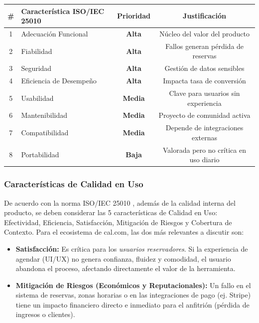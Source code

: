 \documentclass[12pt, a4paper]{article}
\begin{document}
\begin{center}
\begin{tabular}{clcc}
\toprule
\textbf{\#} & \textbf{Característica ISO/IEC 25010} & \textbf{Prioridad} & \textbf{Justificación} \\
\midrule
1 & Adecuación Funcional   & \textbf{Alta}  & Núcleo del valor del producto \\
2 & Fiabilidad             & \textbf{Alta}  & Fallos generan pérdida de reservas \\
3 & Seguridad              & \textbf{Alta}  & Gestión de datos sensibles \\
4 & Eficiencia de Desempeño & \textbf{Alta} & Impacta tasa de conversión \\
5 & Usabilidad             & \textbf{Media} & Clave para usuarios sin experiencia \\
6 & Mantenibilidad         & \textbf{Media} & Proyecto de comunidad activa \\
7 & Compatibilidad         & \textbf{Media} & Depende de integraciones externas \\
8 & Portabilidad           & \textbf{Baja}  & Valorada pero no crítica en uso diario \\
\bottomrule
\end{tabular}
\end{center}

\subsubsection*{Características de Calidad en Uso}
De acuerdo con la norma ISO/IEC 25010 \parencite{iso25010}, además de la calidad interna del producto, se deben considerar las 5 características de Calidad en Uso: Efectividad, Eficiencia, Satisfacción, Mitigación de Riesgos y Cobertura de Contexto. Para el ecosistema de cal.com, las dos más relevantes a discutir son:

\begin{itemize}
    \item \textbf{Satisfacción:} Es crítica para los \textit{usuarios reservadores}. Si la experiencia de agendar (UI/UX) no genera confianza, fluidez y comodidad, el usuario abandona el proceso, afectando directamente el valor de la herramienta.
    \item \textbf{Mitigación de Riesgos (Económicos y Reputacionales):} Un fallo en el sistema de reservas, zonas horarias o en las integraciones de pago (ej. Stripe) tiene un impacto financiero directo e inmediato para el anfitrión (pérdida de ingresos o clientes).
\end{itemize}
\end{document}
